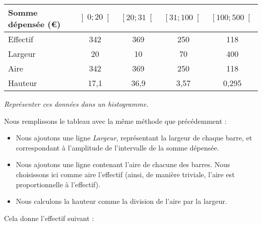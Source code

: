 \documentclass[11pt]{article}
\begin{document}
\begin{exercice}
\begin{enumerate}
      \begin{center}
        \begin{tabular}{p{4cm}|c|c|c|c}
          Somme dépensée (\euro)
          & $\left] 0;20 \right[$
          & $\left[ 20;31 \right[$
          & $\left[ 31;100 \right[$
          & $\left[ 100;500 \right[$
          \\
          \hline
          Effectif
          & 342
          & 369
          & 250
          & 118
          \\
          \hline
          Largeur & 20 & 10 & 70 & 400 \\\hline
          Aire & 342 & 369 & 250 & 118 \\\hline
          Hauteur & 17,1 & 36,9 & 3,57 & 0,295 \\\hline
        \end{tabular}
      \end{center}
      \emph{Représenter ces données dans un histogramme.}

      Nous remplissons le tableau avec la même méthode que précédemment :
      \begin{itemize}
        \item Nous ajoutons une ligne \emph{Largeur}, représentant la largeur de chaque barre, et correspondant à l'amplitude de l'intervalle de la somme dépensée.
        \item Nous ajoutons une ligne contenant l'aire de chacune des barres. Nous choisissons ici comme aire l'effectif (ainsi, de manière triviale, l'aire est proportionnelle à l'effectif).
        \item Nous calculons la hauteur comme la division de l'aire par la largeur.
      \end{itemize}
      Cela donne l'effectif suivant :

  \begin{center}
  \end{center}

  \end{enumerate}
\end{exercice}
\end{document}
